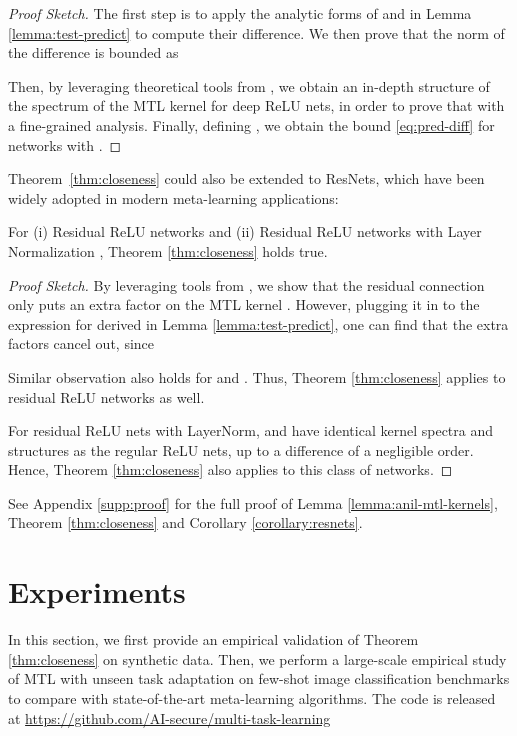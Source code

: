 \documentclass{article}
\begin{document}
\begin{proof}[Proof Sketch]
The first step is to apply the analytic forms of  and  in Lemma \ref{lemma:test-predict} to compute their difference. We then prove that the norm of the difference is bounded as

Then, by leveraging theoretical tools from \citet{xiao2020dis}, we obtain an in-depth structure of the spectrum of the MTL kernel  for deep ReLU nets, in order to prove that  with a fine-grained analysis. Finally, defining , we obtain the bound \eqref{eq:pred-diff} for networks with .
\end{proof}

Theorem~\ref{thm:closeness} could also be extended to ResNets, which have been widely adopted in modern meta-learning applications:
\begin{corollary}\label{corollary:resnets}
\vspace{-1.0em}
For (i) Residual ReLU networks \cite{resnet} and (ii) Residual ReLU networks with Layer Normalization \cite{layernorm}, Theorem \ref{thm:closeness} holds true.
\vspace{-0.5em}
\end{corollary}
\begin{proof}[Proof Sketch]
By leveraging tools from \citet{xiao2020dis}, we show that the residual connection only puts an extra factor  on the MTL kernel . However, plugging it in to the expression for  derived in Lemma \ref{lemma:test-predict}, one can find that the extra factors cancel out, since

Similar observation also holds for  and . Thus, Theorem \ref{thm:closeness} applies to residual ReLU networks as well.

For residual ReLU nets with LayerNorm,  and  have identical kernel spectra and structures as the regular ReLU nets, up to a difference of a negligible order. Hence, Theorem \ref{thm:closeness} also applies to this class of networks.
\end{proof}

See Appendix \ref{supp:proof} for the full proof of Lemma \ref{lemma:anil-mtl-kernels}, Theorem \ref{thm:closeness} and Corollary \ref{corollary:resnets}.

\section{Experiments}
\label{sec:exp}

In this section, we first provide an empirical validation of Theorem \ref{thm:closeness} on synthetic data. Then, we perform a large-scale empirical study of MTL with unseen task adaptation on few-shot image classification benchmarks to compare with state-of-the-art meta-learning algorithms. The code is released at \url{https://github.com/AI-secure/multi-task-learning}
\vspace{-0.5em}
\end{document}
